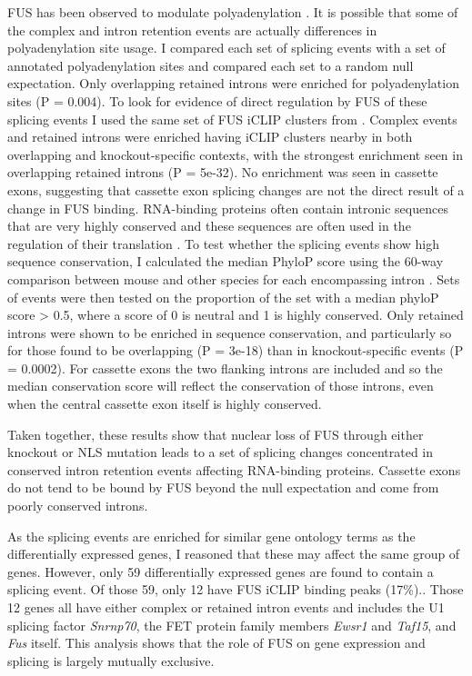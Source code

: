 FUS has been observed to modulate polyadenylation \citep{Masuda2015}.
It is possible that some of the complex and intron retention events are actually differences in polyadenylation site usage.
I compared each set of splicing events with a set of annotated polyadenylation sites \citep{Gruber2016} and compared each set to a random null expectation.
Only overlapping retained introns were enriched for polyadenylation sites (P = 0.004).
To look for evidence of direct regulation by FUS of these splicing events I used the same set of FUS iCLIP clusters from \citep{Rogelj2012}.
Complex events and retained introns were enriched having iCLIP clusters nearby in both overlapping and knockout-specific contexts, with the strongest enrichment seen in overlapping retained introns (P = 5e-32). No enrichment was seen in cassette exons, suggesting that cassette exon splicing changes are not the direct result of a change in FUS binding.
RNA-binding proteins often contain intronic sequences that are very highly conserved \citep{Lareau2007} and these sequences are often used in the regulation of their translation \citep{Ni2007}.
To test whether the splicing events show high sequence conservation, I calculated the median PhyloP score using the 60-way comparison between mouse and other species for each encompassing intron \citep{Pollard2010-fj}.
Sets of events were then tested on the proportion of the set with a median phyloP score > 0.5, where a score of 0 is neutral and 1 is highly conserved.
Only retained introns were shown to be enriched in sequence conservation, and particularly so for those found to be overlapping (P = 3e-18) than in knockout-specific events (P = 0.0002). For cassette exons the two flanking introns are included and so the median conservation score will reflect the conservation of those introns, even when the central cassette exon itself is highly conserved.

Taken together, these results show that nuclear loss of FUS through either knockout or NLS mutation leads to a set of splicing changes concentrated in conserved intron retention events affecting RNA-binding proteins. Cassette exons do not tend to be bound by FUS beyond the null expectation and come from poorly conserved introns.

As the splicing events are enriched for similar gene ontology terms as the differentially expressed genes, I reasoned that these may affect the same group of genes.
However, only 59 differentially expressed genes are found to contain a splicing event. 
Of those 59, only 12 have FUS iCLIP binding peaks (17\%).. 
Those 12 genes all have either complex or retained intron events and includes the U1 splicing factor \textit{Snrnp70}, the FET protein family members \textit{Ewsr1} and \textit{Taf15}, and \textit{Fus} itself. 
This analysis shows that the role of FUS on gene expression and splicing is largely mutually exclusive.


